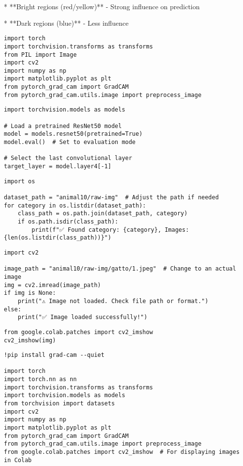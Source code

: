 * **Bright regions (red/yellow)** - Strong influence on prediction

* **Dark regions (blue)** - Less influence

\begin{verbatim}
import torch
import torchvision.transforms as transforms
from PIL import Image
import cv2
import numpy as np
import matplotlib.pyplot as plt
from pytorch_grad_cam import GradCAM
from pytorch_grad_cam.utils.image import preprocess_image

\end{verbatim}

\begin{verbatim}
import torchvision.models as models

# Load a pretrained ResNet50 model
model = models.resnet50(pretrained=True)
model.eval()  # Set to evaluation mode

# Select the last convolutional layer
target_layer = model.layer4[-1]

\end{verbatim}

\begin{verbatim}
import os

dataset_path = "animal10/raw-img"  # Adjust the path if needed
for category in os.listdir(dataset_path):
    class_path = os.path.join(dataset_path, category)
    if os.path.isdir(class_path):
        print(f"✅ Found category: {category}, Images: {len(os.listdir(class_path))}")

\end{verbatim}

\begin{verbatim}
import cv2

image_path = "animal10/raw-img/gatto/1.jpeg"  # Change to an actual image
img = cv2.imread(image_path)
if img is None:
    print("⚠️ Image not loaded. Check file path or format.")
else:
    print("✅ Image loaded successfully!")

\end{verbatim}

\begin{verbatim}
from google.colab.patches import cv2_imshow
cv2_imshow(img)

\end{verbatim}

\begin{verbatim}
!pip install grad-cam --quiet

import torch
import torch.nn as nn
import torchvision.transforms as transforms
import torchvision.models as models
from torchvision import datasets
import cv2
import numpy as np
import matplotlib.pyplot as plt
from pytorch_grad_cam import GradCAM
from pytorch_grad_cam.utils.image import preprocess_image
from google.colab.patches import cv2_imshow  # For displaying images in Colab

\end{verbatim}

